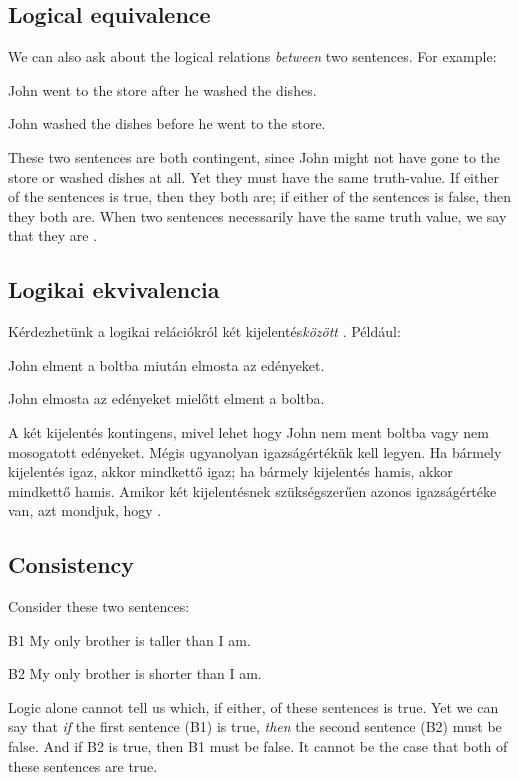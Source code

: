 

\subsection{Logical equivalence}
We can also ask about the logical relations \emph{between} two sentences. For example:
\begin{earg}
\item[] John went to the store after he washed the dishes.
\item[] John washed the dishes before he went to the store.
\end{earg}
These two sentences are both contingent, since John might not have gone to the store or washed dishes at all. Yet they must have the same truth-value. If either of the sentences is true, then they both are; if either of the sentences is false, then they both are. When two sentences necessarily have the same truth value, we say that they are .

\subsection{Logikai ekvivalencia}
Kérdezhetünk a logikai relációkról két kijelentés\emph{között} . Például:
\begin{earg}
\item[] John elment a boltba miután elmosta az edényeket.
\item[] John elmosta az edényeket mielőtt elment a boltba.
\end{earg}
A két kijelentés kontingens, mivel lehet hogy John nem ment boltba vagy nem mosogatott edényeket. Mégis ugyanolyan igazságértékük kell legyen. Ha bármely kijelentés igaz, akkor mindkettő igaz; ha bármely kijelentés hamis, akkor mindkettő hamis. Amikor két kijelentésnek szükségszerűen azonos igazságértéke van, azt mondjuk, hogy .

\subsection{Consistency}
Consider these two sentences:
\begin{ekey}
\item[B1] My only brother is taller than I am.
\item[B2] My only brother is shorter than I am.
\end{ekey}
Logic alone cannot tell us which, if either, of these sentences is true. Yet we can say that \emph{if} the first sentence (B1) is true, \emph{then} the second sentence (B2) must be false. And if B2 is true, then B1 must be false. It cannot be the case that both of these sentences are true.


